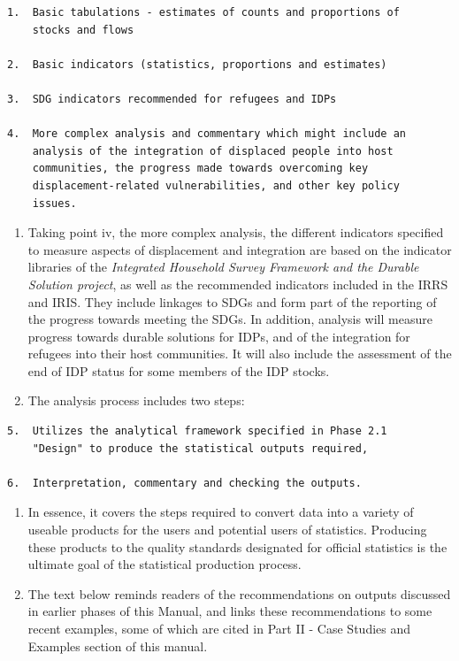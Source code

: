 \documentclass[
]{article}
\begin{document}
\begin{verbatim}
1.  Basic tabulations - estimates of counts and proportions of
    stocks and flows

2.  Basic indicators (statistics, proportions and estimates)

3.  SDG indicators recommended for refugees and IDPs

4.  More complex analysis and commentary which might include an
    analysis of the integration of displaced people into host
    communities, the progress made towards overcoming key
    displacement-related vulnerabilities, and other key policy
    issues.
\end{verbatim}

\begin{enumerate}
\def\labelenumi{\arabic{enumi}.}
\setcounter{enumi}{396}
\item
  Taking point iv, the more complex analysis, the different
  indicators specified to measure aspects of displacement and
  integration are based on the indicator libraries of the \emph{Integrated
  Household Survey Framework and the Durable Solution project}, as
  well as the recommended indicators included in the IRRS and IRIS.
  They include linkages to SDGs and form part of the reporting of the
  progress towards meeting the SDGs. In addition, analysis will
  measure progress towards durable solutions for IDPs, and of the
  integration for refugees into their host communities. It will also
  include the assessment of the end of IDP status for some members of
  the IDP stocks.
\item
  The analysis process includes two steps:
\end{enumerate}

\begin{verbatim}
5.  Utilizes the analytical framework specified in Phase 2.1
    "Design" to produce the statistical outputs required,

6.  Interpretation, commentary and checking the outputs.
\end{verbatim}

\begin{enumerate}
\def\labelenumi{\arabic{enumi}.}
\setcounter{enumi}{398}
\item
  In essence, it covers the steps required to convert data into a
  variety of useable products for the users and potential users of
  statistics. Producing these products to the quality standards
  designated for official statistics is the ultimate goal of the
  statistical production process.
\item
  The text below reminds readers of the recommendations on outputs
  discussed in earlier phases of this Manual, and links these
  recommendations to some recent examples, some of which are cited in
  Part II - Case Studies and Examples section of this manual.
\end{enumerate}
\end{document}
